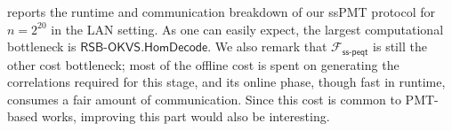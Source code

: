 
 reports the runtime and communication breakdown of our ssPMT protocol for \(n=2^{20}\) in the LAN setting. As one can easily expect, the largest computational bottleneck is \(\mathsf{RSB\mbox{-}OKVS.HomDecode}\). We also remark that $\mathcal{F}_{\mathsf{ss\mbox{-}peqt}}$ is still the other cost bottleneck; most of the offline cost is spent on generating the correlations required for this stage, and its online phase, though fast in runtime, consumes a fair amount of communication. Since this cost is common to PMT-based works, improving this part would also be interesting.

\begin{table}[ht]
    \centering
    \caption{Breakdown of our ssPMT over LAN, for $n=2^{20}$.}
    \label{tab:microbenchmark}

    \footnotesize
    \setlength{\tabcolsep}{3pt}
    \renewcommand{\arraystretch}{1.10}

\end{table}

